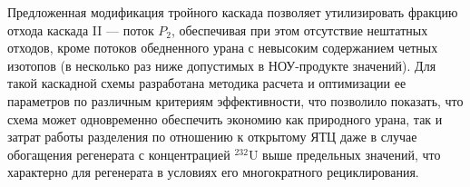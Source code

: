 \begin{enumerate}[label=\Roman*.]
Предложенная модификация тройного каскада позволяет утилизировать фракцию отхода каскада II --- поток $P_2$, обеспечивая при этом отсутствие нештатных отходов, кроме потоков обедненного урана с невысоким содержанием четных изотопов (в несколько раз ниже допустимых в НОУ-продукте значений). Для такой каскадной схемы разработана методика расчета и оптимизации ее параметров по различным критериям эффективности, что позволило показать, что схема может одновременно обеспечить экономию как природного урана, так и затрат работы разделения по отношению к открытому ЯТЦ даже в случае обогащения регенерата с концентрацией $^{232}$U выше предельных значений, что характерно для регенерата в условиях его многократного рециклирования.



\end{enumerate}
